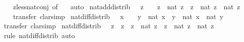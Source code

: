\begin{isabellebody}
%
\isadelimproof
\ \ %
\endisadelimproof
%
\isatagproof
{}\isamarkupfalse%
\ zless{\isacharunderscore}{\kern0pt}nat{\isacharunderscore}{\kern0pt}conj\ {\isacharbrackleft}{\kern0pt}of\ {}{\isacharbrackright}{\kern0pt}\ \isamarkupfalse%
\ auto%
\endisatagproof
{\isafoldproof}%
%
\isadelimproof
\isanewline
%
\endisadelimproof
\isanewline
{}\isamarkupfalse%
\ nat{\isacharunderscore}{\kern0pt}add{\isacharunderscore}{\kern0pt}distrib{\isacharcolon}{\kern0pt}\ {\isachardoublequoteopen}{}\ {\isasymle}\ z\ {\isasymLongrightarrow}\ {}\ {\isasymle}\ z{\isacharprime}{\kern0pt}\ {\isasymLongrightarrow}\ nat\ {\isacharparenleft}{\kern0pt}z\ {\isacharplus}{\kern0pt}\ z{\isacharprime}{\kern0pt}{\isacharparenright}{\kern0pt}\ {\isacharequal}{\kern0pt}\ nat\ z\ {\isacharplus}{\kern0pt}\ nat\ z{\isacharprime}{\kern0pt}{\isachardoublequoteclose}\isanewline
%
\isadelimproof
\ \ %
\endisadelimproof
%
\isatagproof
{}\isamarkupfalse%
\ transfer\ clarsimp%
\endisatagproof
{\isafoldproof}%
%
\isadelimproof
\isanewline
%
\endisadelimproof
\isanewline
{}\isamarkupfalse%
\ nat{\isacharunderscore}{\kern0pt}diff{\isacharunderscore}{\kern0pt}distrib{\isacharprime}{\kern0pt}{\isacharcolon}{\kern0pt}\ {\isachardoublequoteopen}{}\ {\isasymle}\ x\ {\isasymLongrightarrow}\ {}\ {\isasymle}\ y\ {\isasymLongrightarrow}\ nat\ {\isacharparenleft}{\kern0pt}x\ {\isacharminus}{\kern0pt}\ y{\isacharparenright}{\kern0pt}\ {\isacharequal}{\kern0pt}\ nat\ x\ {\isacharminus}{\kern0pt}\ nat\ y{\isachardoublequoteclose}\isanewline
%
\isadelimproof
\ \ %
\endisadelimproof
%
\isatagproof
{}\isamarkupfalse%
\ transfer\ clarsimp%
\endisatagproof
{\isafoldproof}%
%
\isadelimproof
\isanewline
%
\endisadelimproof
\isanewline
{}\isamarkupfalse%
\ nat{\isacharunderscore}{\kern0pt}diff{\isacharunderscore}{\kern0pt}distrib{\isacharcolon}{\kern0pt}\ {\isachardoublequoteopen}{}\ {\isasymle}\ z{\isacharprime}{\kern0pt}\ {\isasymLongrightarrow}\ z{\isacharprime}{\kern0pt}\ {\isasymle}\ z\ {\isasymLongrightarrow}\ nat\ {\isacharparenleft}{\kern0pt}z\ {\isacharminus}{\kern0pt}\ z{\isacharprime}{\kern0pt}{\isacharparenright}{\kern0pt}\ {\isacharequal}{\kern0pt}\ nat\ z\ {\isacharminus}{\kern0pt}\ nat\ z{\isacharprime}{\kern0pt}{\isachardoublequoteclose}\isanewline
%
\isadelimproof
\ \ %
\endisadelimproof
%
\isatagproof
{}\isamarkupfalse%
\ {\isacharparenleft}{\kern0pt}rule\ nat{\isacharunderscore}{\kern0pt}diff{\isacharunderscore}{\kern0pt}distrib{\isacharprime}{\kern0pt}{\isacharparenright}{\kern0pt}\ auto%

\end{isabellebody}
